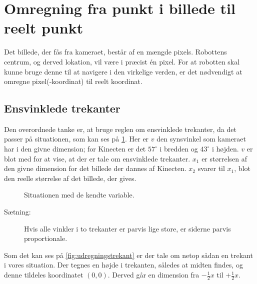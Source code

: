 \section{Omregning fra punkt i billede til reelt punkt}\label{lokalisering:punktomregning}
Det billede, der fås fra kameraet, består af en mængde pixels.
Robottens centrum, og derved lokation, vil være i præcist én pixel.
For at robotten skal kunne bruge denne til at navigere i den virkelige verden, er det nødvendigt at omregne pixel(-koordinat) til reelt koordinat.

\subsection{Ensvinklede trekanter}
Den overordnede tanke er, at bruge reglen om ensvinklede trekanter, da det passer på situationen, som kan ses på \cref{fig:kameratrekant}.
Her er $v$ den synsvinkel som kameraet har i den givne dimension; for Kinecten er det $57^\circ$ i bredden og $43^\circ$ i højden.
$v$ er blot med for at vise, at der er tale om ensvinklede trekanter.
$x_1$ er størrelsen af den givne dimension for det billede der dannes af Kinecten.
$x_2$ svarer til $x_1$, blot den reelle størrelse af det billede, der gives.

\begin{figure}[h]
\centering
{}
\caption{Situationen med de kendte variable.}
\label{fig:kameratrekant}
\end{figure}

\begin{description}
\item[Sætning:]{Hvis alle vinkler i to trekanter er parvis lige store, er siderne parvis proportionale.}
\end{description}
Som det kan ses på \cref{fig:udregningstrekant} er der tale om netop sådan en trekant i vores situation.
Der tegnes en højde i trekanten, således at midten findes, og denne tildeles koordinatet $(0,0)$. 
Derved går en dimension fra $-\frac{1}{2}x$ til $+\frac{1}{2}x$.

